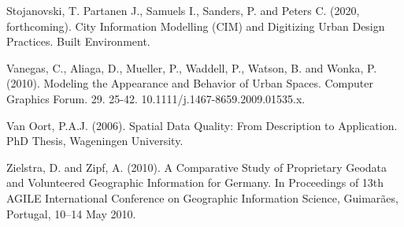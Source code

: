 \documentclass{kththesis}
\begin{document}
\begin{thebibliography}{9}
Stojanovski, T. Partanen J., Samuels I., Sanders, P. and Peters C. (2020, forthcoming). City Information Modelling (CIM) and Digitizing Urban Design Practices. Built Environment.

Vanegas, C., Aliaga, D., Mueller, P., Waddell, P., Watson, B. and Wonka, P. (2010). Modeling the Appearance and Behavior of Urban Spaces. Computer Graphics Forum. 29. 25-42. 10.1111/j.1467-8659.2009.01535.x. 

Van Oort, P.A.J. (2006). Spatial Data Quality: From Description to Application. PhD Thesis, Wageningen University.

Zielstra, D. and Zipf, A. (2010). A Comparative Study of Proprietary Geodata and Volunteered Geographic Information for Germany. In Proceedings of 13th AGILE International Conference on Geographic Information Science, Guimarães, Portugal, 10–14 May 2010.

\end{thebibliography}

\appendix

\tailmatter
\end{document}

